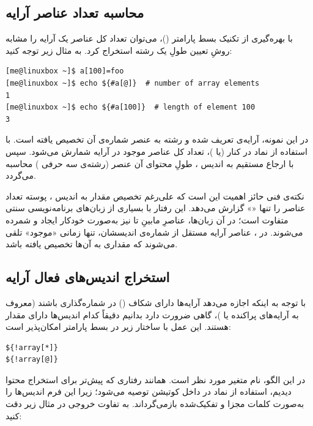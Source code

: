 \subsection{محاسبه تعداد عناصر آرایه}

با بهره‌گیری از تکنیک بسط پارامتر ()، می‌توان تعداد کل عناصر یک آرایه را مشابه روشِ تعیین طولِ یک رشته استخراج کرد. به مثال زیر توجه کنید:

\begin{latin}
\begin{lstlisting}
[me@linuxbox ~]$ a[100]=foo
[me@linuxbox ~]$ echo ${#a[@]}  # number of array elements
1
[me@linuxbox ~]$ echo ${#a[100]}  # length of element 100
3
\end{lstlisting}
\end{latin}

در این نمونه، آرایه‌ی  تعریف شده و رشته  به عنصر شماره‌ی  آن تخصیص یافته است. با استفاده از نماد \cmd{\#} در کنار  (یا \cmd{*})، تعداد کل عناصر موجود در آرایه شمارش می‌شود. سپس با ارجاع مستقیم به اندیس ، طولِ محتوای آن عنصر (رشته‌ی سه حرفی ) محاسبه می‌گردد.

نکته‌ی فنی حائز اهمیت این است که علی‌رغم تخصیص مقدار به اندیس ، پوسته  تعداد عناصر را تنها «» گزارش می‌دهد. این رفتار با بسیاری از زبان‌های برنامه‌نویسی سنتی متفاوت است؛ در آن زبان‌ها، عناصرِ مابینِ  تا  نیز به‌صورت خودکار ایجاد و شمرده می‌شوند. در ، عناصر آرایه مستقل از شماره‌ی اندیسشان، تنها زمانی «موجود» تلقی می‌شوند که مقداری به آن‌ها تخصیص یافته باشد.

\subsection{استخراج اندیس‌های فعال آرایه}

با توجه به اینکه  اجازه می‌دهد آرایه‌ها دارای شکاف () در شماره‌گذاری باشند (معروف به آرایه‌های پراکنده یا )، گاهی ضرورت دارد بدانیم دقیقاً کدام اندیس‌ها دارای مقدار هستند. این عمل با ساختار زیر در بسط پارامتر امکان‌پذیر است:

\begin{latin}
\begin{lstlisting}
${!array[*]}
${!array[@]}
\end{lstlisting}
\end{latin}

در این الگو،  نام متغیر مورد نظر است. همانند رفتاری که پیش‌تر برای استخراج محتوا دیدیم، استفاده از نماد  در داخل کوتیشن توصیه می‌شود؛ زیرا این فرم اندیس‌ها را به‌صورت کلمات مجزا و تفکیک‌شده بازمی‌گرداند. به تفاوت خروجی در مثال زیر دقت کنید:


